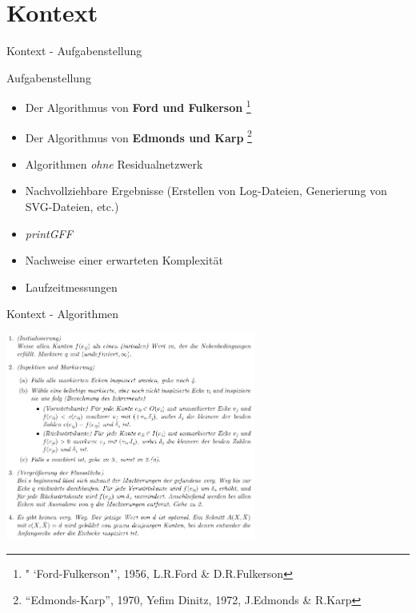 \documentclass{beamer}
\begin{document}
    \section{Kontext}
    \begin{frame}{Kontext - Aufgabenstellung}
        \begin{block}{Aufgabenstellung}
            \begin{itemize}
                \item Der Algorithmus von \textbf{Ford und Fulkerson} \footnote{" `Ford-Fulkerson"', 1956, L.R.Ford \& D.R.Fulkerson}
                \item Der Algorithmus von \textbf{Edmonds und Karp} \footnote{"`Edmonds-Karp"', 1970, Yefim Dinitz, 1972, J.Edmonds \& R.Karp}
                \item Algorithmen \textit{ohne} Residualnetzwerk
                \item Nachvollziehbare Ergebnisse (Erstellen von Log-Dateien, Generierung von SVG-Dateien, etc.)
                \item \textit{printGFF}
                \item Nachweise einer erwarteten Komplexit\"at
                \item Laufzeitmessungen
            \end{itemize}
        \end{block}
    \end{frame}

    \begin{frame}{Kontext - Algorithmen}
        \begin{center}
            \includegraphics[height=6.8cm]{../algorithmus.PNG}
        \end{center}
    \end{frame}
\end{document}
